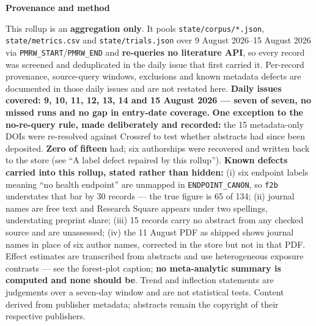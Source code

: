 \documentclass[10pt]{article}
\newcommand{\PERIODSTART}{9 August 2026}
\newcommand{\PERIODEND}{15 August 2026}
\begin{document}
\vspace{4mm}
\begin{keybox}
{\sffamily\bfseries\footnotesize\color{Deep}Provenance and method}\\[1.2mm]
{\fontsize{7.2}{8.8}\selectfont
This rollup is an \textbf{aggregation only}. It pools \texttt{state/corpus/*.json},
\texttt{state/metrics.csv} and \texttt{state/trials.json} over
\PERIODSTART{}--\PERIODEND{} via \texttt{PMRW\_START}/\texttt{PMRW\_END} and
\textbf{re-queries no literature API}, so every record was screened and deduplicated in
the daily issue that first carried it. Per-record provenance, source-query windows,
exclusions and known metadata defects are documented in those daily issues and are not
restated here. \textbf{Daily issues covered: 9, 10, 11, 12, 13, 14 and 15 August 2026 ---
seven of seven, no missed runs and no gap in entry-date coverage.}
\textbf{One exception to the no-re-query rule, made deliberately and recorded:} the 15
metadata-only DOIs were re-resolved against Crossref to test whether abstracts had since
been deposited. \textbf{Zero of fifteen} had; six authorships were recovered and written
back to the store (see ``A label defect repaired by this rollup'').
\textbf{Known defects carried into this rollup, stated rather than hidden:}
(i) six endpoint labels meaning ``no health endpoint'' are unmapped in
\texttt{ENDPOINT\_CANON}, so \texttt{f2b} understates that bar by 30 records --- the true
figure is 65 of 134; (ii) journal names are free text and Research Square appears under
two spellings, understating preprint share; (iii) 15 records carry no abstract from any
checked source and are unassessed; (iv) the 11 August PDF as shipped shows journal names
in place of six author names, corrected in the store but not in that PDF.
Effect estimates are transcribed from abstracts and use heterogeneous exposure contrasts
--- see the forest-plot caption; \textbf{no meta-analytic summary is computed and none
should be}. Trend and inflection statements are judgements over a seven-day window and are
not statistical tests. Content derived from publisher metadata; abstracts remain the
copyright of their respective publishers.\par}
\end{keybox}
\end{document}
